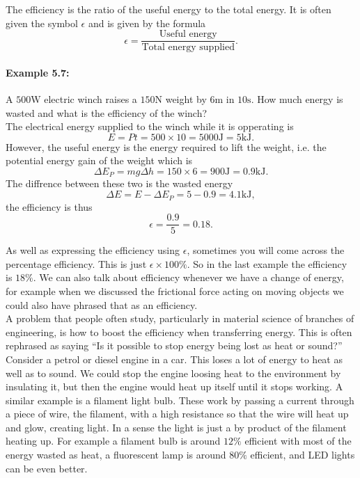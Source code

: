 \documentclass[a4paper,12pt]{book}
\begin{document}
The efficiency is the ratio of the useful energy to the total energy. It is often given the symbol $\epsilon$ and is given by the formula
\begin{equation*}
\epsilon =\frac{\text{Useful energy}}{\text{Total energy supplied}}.
\end{equation*}

\paragraph{Example 5.7:}  A $500\text{W}$ electric winch raises a $150\text{N}$ weight by $6\text{m}$ in $10\text{s}$. How much energy is wasted and what is the efficiency of the winch?\\

The electrical energy supplied to the winch while it is opperating is
\begin{equation*}
E=Pt=500\times 10=5000\text{J} = 5\text{kJ}.
\end{equation*}
However, the useful energy is the energy required to lift the weight, i.e. the potential energy gain of the weight which is
\begin{equation*}
\Delta E_{P}=mg \Delta h=150\times 6=900\text{J}=0.9\text{kJ}.
\end{equation*}
The diffrence between these two is the wasted energy
\begin{equation*}
\Delta E= E-\Delta E_{P}=5-0.9=4.1\text{kJ},
\end{equation*}
the efficiency is thus 
\begin{equation*}
\epsilon =\frac{0.9}{5}=0.18.
\end{equation*}

As well as expressing the efficiency using $\epsilon$, sometimes you will come across the percentage efficiency. This is just $\epsilon\times 100\%$. So in the last example the efficiency is $18\%$. We can also talk about efficiency whenever we have a change of energy, for example when we discussed the frictional force acting on moving objects we could also have phrased that as an efficiency. \\

A problem that people often study, particularly in material science of branches of engineering, is how to boost the efficiency when transferring energy. This is often rephrased as saying ``Is it possible to stop energy being lost as heat or sound?''\\

Consider a petrol or diesel engine in a car. This loses a lot of energy to heat as well as to sound. We could stop the engine loosing heat to the environment by insulating it, but then the engine would heat up itself until it stops working.  A similar example is a filament light bulb. These work by passing a current through a piece of wire, the filament, with a high resistance so that the wire will heat up and glow, creating light. In a sense the light is just a by product of the filament heating up. For example a filament bulb is around $12\%$ efficient with most of the energy wasted as heat, a fluorescent lamp is around $80\%$ efficient, and LED lights can be even better.\\
\end{document}
